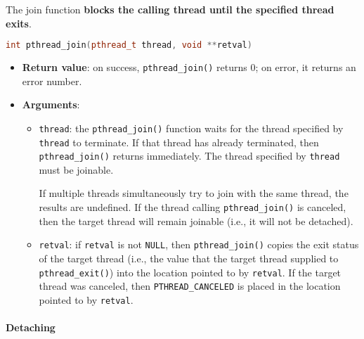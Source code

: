 The join function \textbf{blocks the calling thread until the specified thread exits}.
\begin{pthreadbox}
    \begin{lstlisting}[language=c++]
int pthread_join(pthread_t thread, void **retval)\end{lstlisting}
\end{pthreadbox}
\begin{itemize}
    \item \textbf{Return value}: on success, \texttt{pthread\_join()} returns 0; on error, it returns an error number.
    \item \textbf{Arguments}:
    \begin{itemize}
        \item \texttt{thread}: the \texttt{pthread\_join()} function waits for the thread specified by \texttt{thread} to terminate. If that thread has already terminated, then \texttt{pthread\_join()} returns immediately. The thread specified by \texttt{thread} must be joinable.
        
        If multiple threads simultaneously try to join with the same thread, the results are undefined.  If the thread calling \texttt{pthread\_join()} is canceled, then the target thread will remain joinable (i.e., it will not be detached).
        
        \item \texttt{retval}: if \texttt{retval} is not \texttt{NULL}, then \texttt{pthread\_join()} copies the exit status of the target thread (i.e., the value that the target thread supplied to \texttt{pthread\_exit()}) into the location pointed to by \texttt{retval}. If the target thread was canceled, then \texttt{PTHREAD\_CANCELED} is placed in the location pointed to by \texttt{retval}.
    \end{itemize}
\end{itemize}

\newpage

\paragraph{Detaching}\label{paragraph: Detaching}

